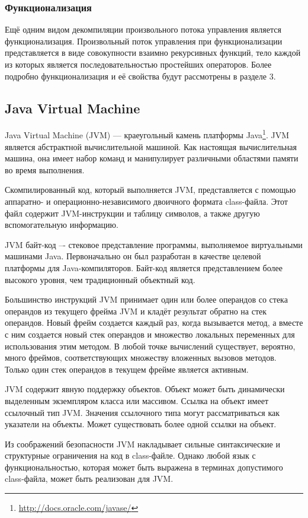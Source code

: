 \subsubsection*{Функционализация}
Ещё одним видом декомпиляции произвольного потока управления является функционализация. Произвольный поток управления при функционализации представляется в виде совокупности взаимно рекурсивных функций, тело каждой из которых является последовательностью простейших операторов. Более подробно функционализация и её свойства будут рассмотрены в разделе 3.

\subsection{Java Virtual Machine}
Java Virtual Machine (JVM) --- краеугольный камень платформы Java\footnote{\url{http://docs.oracle.com/javase/}}. JVM является абстрактной вычислительной машиной. Как настоящая вычислительная машина, она имеет набор команд и манипулирует различными областями памяти во время выполнения. 

Скомпилированный код, который выполняется JVM, представляется с помощью аппаратно- и операционно-независимого двоичного формата class-файла. Этот файл содержит JVM-инструкции и таблицу символов, а также другую вспомогательную информацию.

JVM байт-код –- стековое представление программы, выполняемое виртуальными машинами Java. Первоначально он был разработан в качестве целевой платформы для Java-компиляторов. Байт-код является представлением более высокого уровня, чем традиционный объектный код.

Большинство инструкций JVM принимает один или более операндов со стека операндов из текущего фрейма JVM и кладёт результат обратно на стек операндов. Новый фрейм создается каждый раз, когда вызывается метод, а вместе с ним создается новый стек операндов и множество локальных переменных для использования этим методом. В любой точке вычислений существует, вероятно, много фреймов, соответствующих множеству вложенных вызовов методов. Только один стек операндов в текущем фрейме является активным.

JVM содержит явную поддержку объектов. Объект может быть динамически выделенным экземпляром класса или массивом. Ссылка на объект имеет ссылочный тип JVM. Значения ссылочного типа могут рассматриваться как указатели на объекты. Может существовать более одной ссылки на объект\cite{jvm}.

Из соображений безопасности JVM накладывает сильные синтаксические и структурные ограничения на код в class-файле. Однако любой язык с функциональностью, которая может быть выражена в терминах допустимого class-файла, может быть реализован для JVM. 

